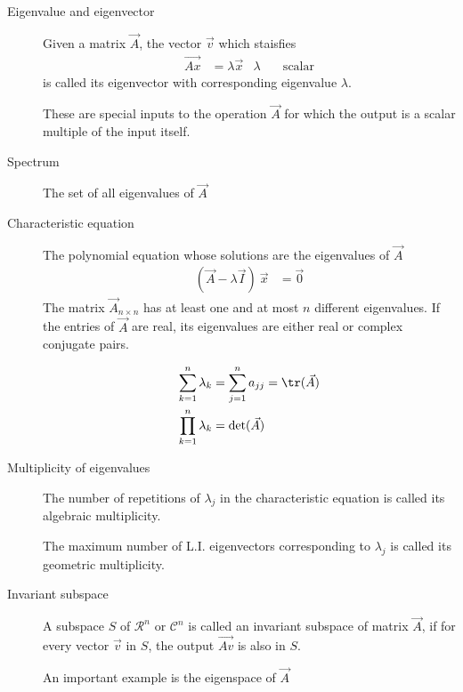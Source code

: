 \begin{description}
    \item[Eigenvalue and eigenvector] Given a matrix $ \vec{A} $, the vector $ \vec{v} $
        which staisfies
        \begin{align}
            \vec{Ax} & = \lambda \vec{x} & \lambda & \quad \text{scalar}
        \end{align}
        is called its eigenvector with corresponding eigenvalue $ \lambda $. \par
        These are special inputs to the operation $ \vec{A} $ for which the output is
        a scalar multiple of the input itself.

    \item[Spectrum] The set of all eigenvalues of $ \vec{A} $

    \item[Characteristic equation] The polynomial equation whose solutions are the
        eigenvalues of $ \vec{A} $
        \begin{align}
            (\vec{A} - \lambda \vec{I})\ \vec{x} & = \vec{0}
        \end{align}
        The matrix $ \vec{A}_{n \times n} $ has at least one and at most $ n $ different
        eigenvalues. If the entries of $ \vec{A} $ are real, its eigenvalues are either
        real or complex conjugate pairs.

        \begin{align}
            \sum_{k=1}^{n} \lambda_k  & = \sum_{j=1}^{n} a_{jj} = \tr(\vec{A}) \\
            \prod_{k=1}^{n} \lambda_k & = \det(\vec{A})
        \end{align}

    \item[Multiplicity of eigenvalues] The number of repetitions of $ \lambda_j $ in
        the characteristic equation is called its algebraic multiplicity. \par
        The maximum number of L.I. eigenvectors corresponding to $ \lambda_j $ is called
        its geometric multiplicity.

    \item[Invariant subspace] A subspace $ S $ of $ \mathcal{R}^n $ or
        $ \mathcal{C}^n $ is called an invariant subspace of matrix $ \vec{A} $, if for
        every vector $ \vec{v} $ in $ S $, the output $ \vec{Av} $ is also in $ S $.
        \par An important example is the eigenspace of $ \vec{A} $


\end{description}
